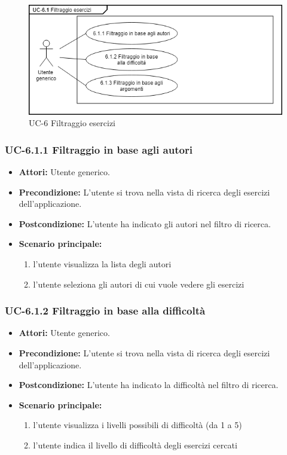 		\begin{figure}[h]
			\centering
			\includegraphics[scale=0.7]{images/UC-6.png}
			\caption{UC-6 Filtraggio esercizi}
		\end{figure}	

\subsubsection{UC-6.1.1 Filtraggio in base agli autori}
	\begin{itemize}
		\item \textbf{Attori:} Utente generico.
		\item \textbf{Precondizione: } L'utente si trova nella vista di ricerca degli esercizi dell'applicazione.
		\item \textbf{Postcondizione: } L'utente ha indicato gli autori nel filtro di ricerca.
		\item \textbf{Scenario principale:}
		\begin{enumerate}
			\item l'utente visualizza la lista degli autori
			\item l'utente seleziona gli autori di cui vuole vedere gli esercizi
		\end{enumerate}
	\end{itemize}

\subsubsection{UC-6.1.2 Filtraggio in base alla difficoltà}
	\begin{itemize}
		\item \textbf{Attori:} Utente generico.
		\item \textbf{Precondizione: } L'utente si trova nella vista di ricerca degli esercizi dell'applicazione.
		\item \textbf{Postcondizione: } L'utente ha indicato la difficoltà nel filtro di ricerca.
		\item \textbf{Scenario principale:}
		\begin{enumerate}
			\item l'utente visualizza i livelli possibili di difficoltà (da 1 a 5)
			\item l'utente indica il livello di difficoltà degli esercizi cercati
		\end{enumerate}
	\end{itemize}


